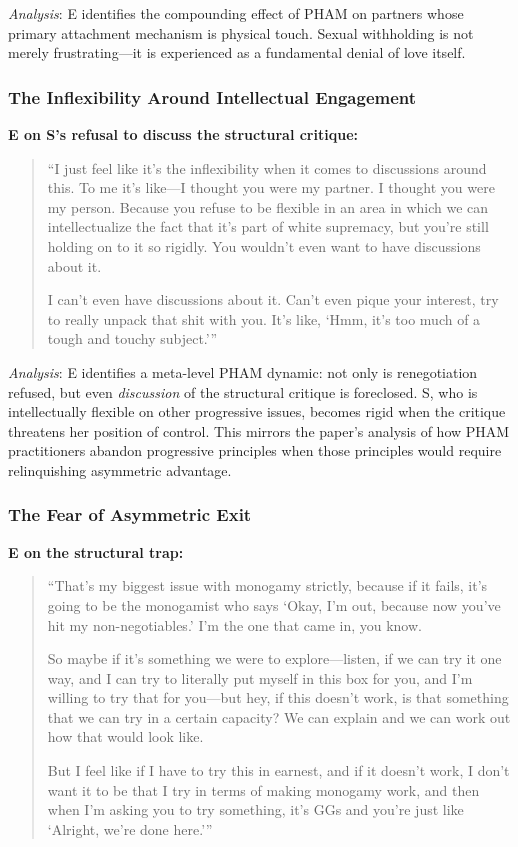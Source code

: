 \documentclass[12pt, letterpaper]{article}
\begin{document}
\textit{Analysis}: E identifies the compounding effect of PHAM on partners whose primary attachment mechanism is physical touch. Sexual withholding is not merely frustrating---it is experienced as a fundamental denial of love itself.

\subsubsection{The Inflexibility Around Intellectual Engagement}

\textbf{E on S's refusal to discuss the structural critique:}
\begin{quote}
``I just feel like it's the inflexibility when it comes to discussions around this. To me it's like---I thought you were my partner. I thought you were my person. Because you refuse to be flexible in an area in which we can intellectualize the fact that it's part of white supremacy, but you're still holding on to it so rigidly. You wouldn't even want to have discussions about it.

I can't even have discussions about it. Can't even pique your interest, try to really unpack that shit with you. It's like, `Hmm, it's too much of a tough and touchy subject.'''
\end{quote}

\textit{Analysis}: E identifies a meta-level PHAM dynamic: not only is renegotiation refused, but even \textit{discussion} of the structural critique is foreclosed. S, who is intellectually flexible on other progressive issues, becomes rigid when the critique threatens her position of control. This mirrors the paper's analysis of how PHAM practitioners abandon progressive principles when those principles would require relinquishing asymmetric advantage.

\subsubsection{The Fear of Asymmetric Exit}

\textbf{E on the structural trap:}
\begin{quote}
``That's my biggest issue with monogamy strictly, because if it fails, it's going to be the monogamist who says `Okay, I'm out, because now you've hit my non-negotiables.' I'm the one that came in, you know.

So maybe if it's something we were to explore---listen, if we can try it one way, and I can try to literally put myself in this box for you, and I'm willing to try that for you---but hey, if this doesn't work, is that something that we can try in a certain capacity? We can explain and we can work out how that would look like.

But I feel like if I have to try this in earnest, and if it doesn't work, I don't want it to be that I try in terms of making monogamy work, and then when I'm asking you to try something, it's GGs and you're just like `Alright, we're done here.'''
\end{quote}
\end{document}
